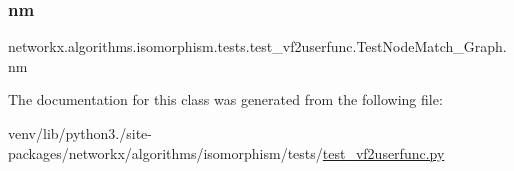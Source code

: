 \subsubsection{\texorpdfstring{nm}{nm}}
{\footnotesize\ttfamily networkx.\+algorithms.\+isomorphism.\+tests.\+test\+\_\+vf2userfunc.\+Test\+Node\+Match\+\_\+\+Graph.\+nm}



The documentation for this class was generated from the following file\+:\begin{DoxyCompactItemize}
\item 
venv/lib/python3./site-\/packages/networkx/algorithms/isomorphism/tests/\hyperlink{test__vf2userfunc_8py}{test\+\_\+vf2userfunc.\+py}\end{DoxyCompactItemize}
